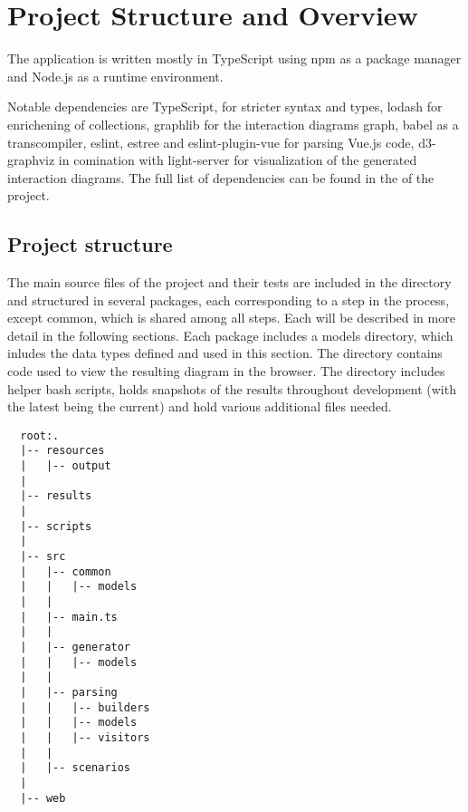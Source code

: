 \section{Project Structure and Overview}
The application is written mostly in TypeScript using npm as a package manager and Node.js as a runtime environment. 




Notable dependencies are TypeScript, for stricter syntax and types, lodash\parencite{lodash} for enrichening of collections, graphlib\parencite{graphlib} for the interaction diagrams graph,  babel\parencite{babel} as a transcompiler, eslint\parencite{eslintMainPage}, estree\parencite{estreeASTSpec} and eslint-plugin-vue\parencite{eslint_vue_parser} for parsing Vue.js code, d3-graphviz\parencite{graph_viz} in comination with light-server\parencite{light_server} for visualization of the generated interaction diagrams. The full list of dependencies can be found in the  of the project.


\subsection{Project structure}
The main source files of the project and their tests are included in the  directory and structured in several packages, each corresponding to a step in the process, except common, which is shared among all steps. Each will be described in more detail in the following sections.
Each package includes a models directory, which inludes the data types defined and used in this section.
The  directory contains code used to view the resulting diagram in the browser.
The  directory includes helper bash scripts,  holds snapshots of the results throughout development (with the latest being the current) and  hold various additional files needed.
\begin{lstlisting}
  root:.
  |-- resources
  |   |-- output
  |
  |-- results
  |
  |-- scripts
  |
  |-- src
  |   |-- common
  |   |   |-- models
  |   |
  |   |-- main.ts
  |   |
  |   |-- generator
  |   |   |-- models
  |   |
  |   |-- parsing
  |   |   |-- builders
  |   |   |-- models
  |   |   |-- visitors
  |   |
  |   |-- scenarios
  |
  |-- web
\end{lstlisting}

